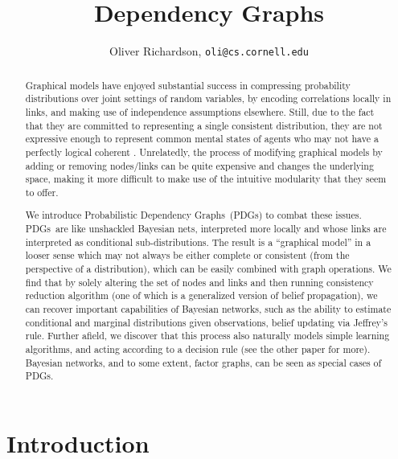 \documentclass{article}
\title{Dependency Graphs}
\author{Oliver Richardson,  \texttt{oli@cs.cornell.edu}}
\newcommand{\modelnames}{Probabilistic Dependency Graphs}
\newcommand{\MNs}{PDGs}
\begin{document}
	\maketitle

	\begin{abstract}
		Graphical models have enjoyed substantial success in compressing probability distributions over joint settings of random variables, by encoding correlations locally in links, and making use of independence assumptions elsewhere. Still, due to the fact that they are committed to representing a single consistent distribution, they are not expressive enough to represent common mental states of agents who may not have a perfectly logical coherent . Unrelatedly, the process of modifying graphical models by adding or removing nodes/links can be quite expensive and changes the underlying space, making it more difficult to make use of the intuitive modularity that they seem to offer.
		
		We introduce \modelnames\ (\MNs) to combat these issues. \MNs\ are like unshackled Bayesian nets, interpreted more locally and whose links are interpreted as conditional sub-distributions. The result is a “graphical model” in a looser sense which may not always be either complete or consistent (from the perspective of a distribution), which can be easily combined with graph operations. We find that by solely altering the set of nodes and links and then running consistency reduction algorithm (one of which is a generalized version of belief propagation), we can recover important capabilities of Bayesian networks, such as the ability to estimate conditional and marginal distributions given observations, belief updating via Jeffrey’s rule. Further afield, we discover that this process also naturally models simple learning algorithms, and acting according to a decision rule (see the other paper for more). Bayesian networks, and to some extent, factor graphs, can be seen as special cases of \MNs.
	\end{abstract}

	\tableofcontents

	\section{Introduction}
\end{document}
